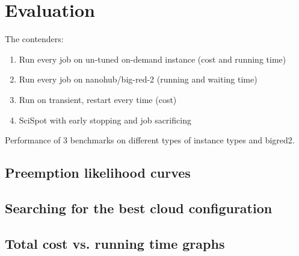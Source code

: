 \section{Evaluation}

The contenders:
\begin{enumerate}
\item Run every job on un-tuned on-demand instance (cost and running time)
\item Run every job on nanohub/big-red-2 (running and waiting time)
\item Run on transient, restart every time (cost)
\item SciSpot with early stopping and job sacrificing 
\end{enumerate}

Performance of 3 benchmarks on different types of instance types and bigred2.



\subsection{Preemption likelihood curves}

\subsection{Searching for the best cloud configuration}

\subsection{Total cost vs. running time graphs}


